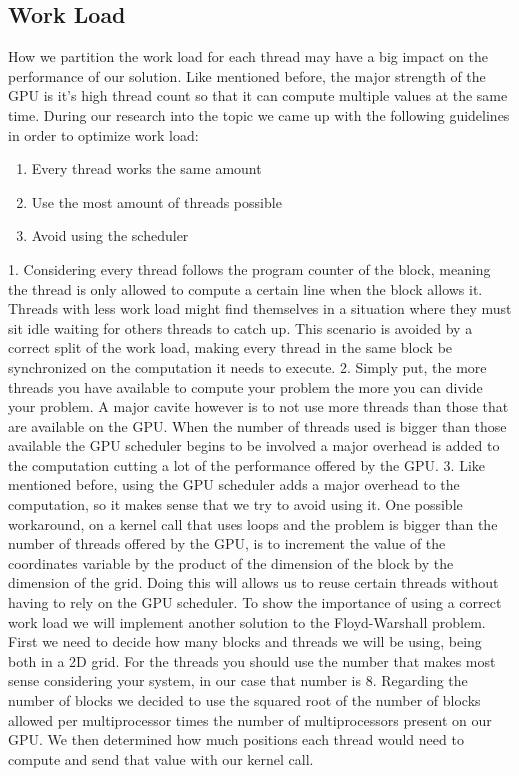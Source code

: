 \documentclass[runningheads]{llncs}
\begin{document}
\subsection{Work Load}

How we partition the work load for each thread may have a big impact on the performance of our solution. Like mentioned before, the major strength of the GPU is it's high thread count so that it can compute multiple values at the same time.
During our research into the topic we came up with the following guidelines in order to optimize work load: %
\begin{enumerate}
	\item Every thread works the same amount
	\item Use the most amount of threads possible
	\item Avoid using the scheduler
	\newline
\end{enumerate}
1. Considering every thread follows the program counter of the block, meaning the thread is only allowed to compute a certain line when the block allows it.
Threads with less work load might find themselves in a situation where they must sit idle waiting for others threads to catch up.
This scenario is avoided by a correct split of the work load, making every thread in the same block be synchronized on the computation it needs to execute.
\newline
\newline
2. Simply put, the more threads you have available to compute your problem the more you can divide your problem. A major cavite however is to not use more threads than those that are available on the GPU. When the number of threads used is bigger than those available the GPU scheduler begins to be involved a major overhead is added to the computation cutting a lot of the performance offered by the GPU.
\newline
\newline
3. Like mentioned before, using the GPU scheduler adds a major overhead to the computation, so it makes sense that we try to avoid using it.
One possible workaround, on a kernel call that uses loops and the problem is bigger than the number of threads offered by the GPU, is to increment the value of the coordinates variable by the product of the dimension of the block by the dimension of the grid. Doing this will allows us to reuse certain threads without having to rely on the GPU scheduler.
\newline
\newline
To show the importance of using a correct work load we will implement another solution to the Floyd-Warshall problem. First we need to decide how many blocks and threads we will be using, being both in a 2D grid. For the threads you should use the number that makes most sense considering your system, in our case that number is 8. Regarding the number of blocks we decided to use the squared root of the number of blocks allowed per multiprocessor times the number of multiprocessors present on our GPU. We then determined how much positions each thread would need to compute and send that value with our kernel call.
\end{document}
